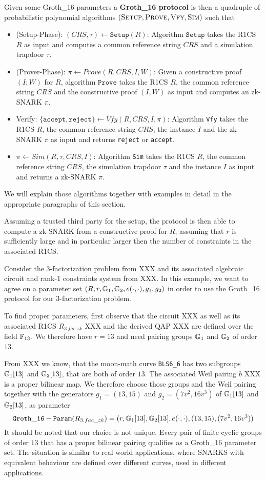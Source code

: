 Given some Groth\_16 parameters a \textbf{Groth\_16 protocol} is then a quadruple of probabilistic polynomial algorithms $(\textsc{Setup},\textsc{Prove},\textsc{Vfy},\textsc{Sim})$ such that
\begin{itemize}
\item (Setup-Phase): $(CRS,\tau)\leftarrow \mathtt{Setup}(R)$: Algorithm $\mathtt{Setup}$ takes the R1CS $R$ as input and computes a common reference string $CRS$ and a simulation trapdoor $\tau$.
\item (Prover-Phase): $\pi\leftarrow Prove(R,CRS,I,W)$: Given a constructive proof $(I;W)$ for $R$, algorithm $\mathtt{Prove}$ takes the R1CS $R$, the common reference string $CRS$ and the constructive proof $(I,W)$ as input and computes an zk-SNARK $\pi$.
\item Verify: $\{\mathtt{accept},\mathtt{reject}\}\leftarrow Vfy(R,CRS,I,\pi)$:   Algorithm \texttt{Vfy} takes the R1CS $R$, the common reference string $CRS$, the instance $I$ and the zk-SNARK $\pi$ as input and returns \texttt{reject} or \texttt{accept}.
\item $\pi\leftarrow Sim(R,\tau,CRS, I)$: Algorithm \texttt{Sim} takes the R1CS $R$, the common reference string $CRS$, the simulation trapdoor $\tau$ and the instance $I$ as input and returns a zk-SNARK $\pi$. 
\end{itemize}
We will explain those algorithms together with examples in detail in the appropriate paragraphs of this section.

Assuming a trusted third party for the setup, the protocol is then able to compute a zk-SNARK from a constructive proof for $R$, assuming that $r$ is sufficiently large and in particular larger then the number of constraints in the associated R1CS.
\begin{example} Consider the $3$-factorization problem from XXX and its associated algebraic circuit and rank-1 constraints system from  XXX. In this example, we want to agree on a parameter set $(R,r, \mathbb{G}_1, \mathbb{G}_2, e(\cdot,\cdot), g_1,g_2)$ in order to use the Groth\_16 protocol for our $3$-factorization problem. 

To find proper parameters, first observe that the circuit XXX as well as its associated R1CS $R_{3.fac\_zk}$ XXX and the derived QAP XXX are defined over the field $\mathbb{F}_{13}$. We therefore have $r=13$ and need pairing groups $\mathbb{G}_1$ and $\mathbb{G}_2$ of order $13$. 

From XXX we know, that the moon-math curve \texttt{BLS6\_6} has two subgroups $\mathbb{G}_1[13]$ and $\mathbb{G}_2[13]$, that are both of order $13$. The associated Weil pairing $b$ XXX is a proper bilinear map. We therefore choose those groups and the Weil pairing together with the generators $g_1 = (13,15) $ and $g_2=(7v^2,16v^3)$ of $\mathbb{G}_1[13]$ and $\mathbb{G}_2[13]$, as parameter
$$
\mathtt{Groth\_16-Param}(R_{3.fac\_zk})=(r, \mathbb{G}_1[13], \mathbb{G}_2[13], e(\cdot,\cdot), (13,15),(7v^2,16v^3))
$$
It should be noted that our choice is not unique. Every pair of finite cyclic groups of order $13$ that has a proper bilinear pairing qualifies as a Groth\_16 parameter set. The situation is similar to real world applications, where SNARKS with equivalent behaviour are defined over different curves, used in different applications.
\end{example}
